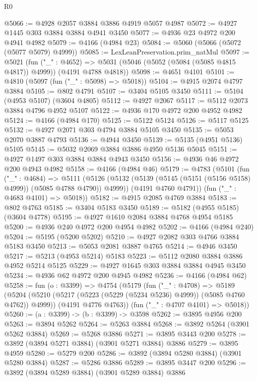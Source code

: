\begin{lexlean}{R0}
\begin{coremodule}
@5066 := @4928 @2057 @3884 @3886 @4919 @5057 @4987
@5072 := @4927 @1445 @303 @3884 @3884 @4941 @3450
@5077 := @4936 @23 @4972 @200 @4941 @4982
@5079 := @4166 (@4984 @23)
@5084 := @5060 (@5066 (@5072 (@5077 @5079) @4999))
@5085 := LexLeanPreservation.prim_natMul
@5097 := @5021
    (fun ("_" : @4652) =>
    @5031 (@5046 (@5052 (@5084 (@5085 @4815 @4817)) @4999)) (@4191 @4788 @4818))
@5098 := @4651 @4101
@5101 := @4810 (@5097 (fun ("_" : @5098) => @5018))
@5104 := @4915 @2074 @4797 @3884
@5105 := @802 @4791
@5107 := @3404 @5105 @3450
@5111 := @5104 (@4953 @5107) (@3604 @4805)
@5112 := @4927 @2067
@5117 := @5112 @2073 @3884 @4796 @4952 @5107
@5122 := @4936 @170 @4972 @200 @4952 @4982
@5124 := @4166 (@4984 @170)
@5125 := @5122 @5124
@5126 := @5117 @5125
@5132 := @4927 @2071 @303 @4794 @3884 @5105 @3450
@5135 := @5053 @2070 @3887 @4793
@5136 := @4944 @3450
@5139 := @5135 (@4951 @5136) @5105
@5145 := @5032 @2069 @3884 @3886 @4950 @5136 @5045
@5151 := @4927 @1497 @303 @3884 @3884 @4943 @3450
@5156 := @4936 @46 @4972 @200 @4943 @4982
@5158 := @4166 (@4984 @46)
@5179 := @4783
    (@5101
      (fun ("_" : @4684) =>
      @5111
        (@5126 (@5132 (@5139 (@5145 (@5151 (@5156 @5158) @4999)) (@5085 @4788 @4790)) @4999))
        (@4191 @4760 @4791))
      (fun ("_" : @4683 @4101) => @5018))
@5182 := @4915 @2085 @4769 @3884
@5183 := @802 @4763
@5185 := @3404 @5183 @3450
@5189 := @5182 (@4955 @5185) (@3604 @4778)
@5195 := @4927 @1610 @2084 @3884 @4768 @4954 @5185
@5200 := @4936 @240 @4972 @200 @4954 @4982
@5202 := @4166 (@4984 @240)
@5204 := @5195 (@5200 @5202)
@5210 := @4927 @2082 @303 @4766 @3884 @5183 @3450
@5213 := @5053 @2081 @3887 @4765
@5214 := @4946 @3450
@5217 := @5213 (@4953 @5214) @5183
@5223 := @5112 @2080 @3884 @3886 @4952 @5214 @5125
@5229 := @4927 @1645 @303 @3884 @3884 @4945 @3450
@5234 := @4936 @62 @4972 @200 @4945 @4982
@5236 := @4166 (@4984 @62)
@5258 := fun (o : @3399) =>
  @4754
    (@5179
      (fun ("_" : @4708) =>
      @5189
        (@5204 (@5210 (@5217 (@5223 (@5229 (@5234 @5236) @4999)) (@5085 @4760 @4762)) @4999))
        (@4191 @4776 @4763))
      (fun ("_" : @4707 @4101) => @5018))
@5260 := (a : @3399) -> (b : @3399) -> @3598
@5262 := @3895 @4956 @200
@5263 := @3894 @5262
@5264 := @5263 @3884
@5268 := @3892 @5264 (@3901 @5262 @3884)
@5269 := @5268 @3886
@5271 := @3895 @3443 @200
@5278 := @3892 (@3894 @5271 @3884) (@3901 @5271 @3884) @3886
@5279 := @3895 @4959
@5280 := @5279 @200
@5286 := @3892 (@3894 @5280 @3884) (@3901 @5280 @3884)
@5287 := @5286 @3886
@5289 := @3895 @3447 @200
@5296 := @3892 (@3894 @5289 @3884) (@3901 @5289 @3884) @3886

\end{coremodule}
\end{lexlean}
